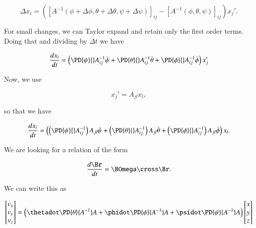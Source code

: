 \begin{equation}\label{eqn:classicalMechanicsEulerAngles:320}
\Delta x_i = 
\left(
[A^{-1}(\phi + \Delta \phi, \theta + \Delta \theta, \psi + \Delta \psi)]_{ij} 
-[A^{-1}(\phi, \theta, \psi)]_{ij} 
\right)
x_j'.
\end{equation}

For small changes, we can Taylor expand and retain only the first order terms.  Doing that and dividing by $\Delta t$ we have

\begin{equation}\label{eqn:classicalMechanicsEulerAngles:340}
\frac{d x_i}{dt} =
\left(
\PD{\psi}{} A^{-1}_{ij} \dot{\psi}
+\PD{\theta}{} A^{-1}_{ij} \dot{\theta}
+\PD{\phi}{} A^{-1}_{ij} \dot{\phi}
\right) x_j'
\end{equation}

Now, we use

\begin{equation}\label{eqn:classicalMechanicsEulerAngles:360}
x_j' = A_{jl} x_l,
\end{equation}

so that we have

\begin{equation}\label{eqn:classicalMechanicsEulerAngles:380}
\frac{d x_i}{dt} =
\left(
\left(\PD{\psi}{} A^{-1}_{ij} \right) A_{jl} \dot{\psi}
+\left(\PD{\theta}{} A^{-1}_{ij} \right) A_{jl} \dot{\theta}
+\left(\PD{\phi}{} A^{-1}_{ij} \right) A_{jl} \dot{\phi}
\right) x_l.
\end{equation}

We are looking for a relation of the form

\begin{equation}\label{eqn:classicalMechanicsEulerAngles:400}
\frac{d\Br}{dt} = \BOmega \cross \Br.
\end{equation}

We can write this as

\begin{equation}\label{eqn:classicalMechanicsEulerAngles:420}
\begin{bmatrix}
v_x \\
v_y \\
v_z
\end{bmatrix} 
=
\left(
\thetadot \PD{\theta}{A^{-1}} A
+\phidot \PD{\phi}{A^{-1}} A
+\psidot \PD{\psi}{A^{-1}} A
\right)
\begin{bmatrix}
x \\
y \\
z
\end{bmatrix} 
\end{equation}

